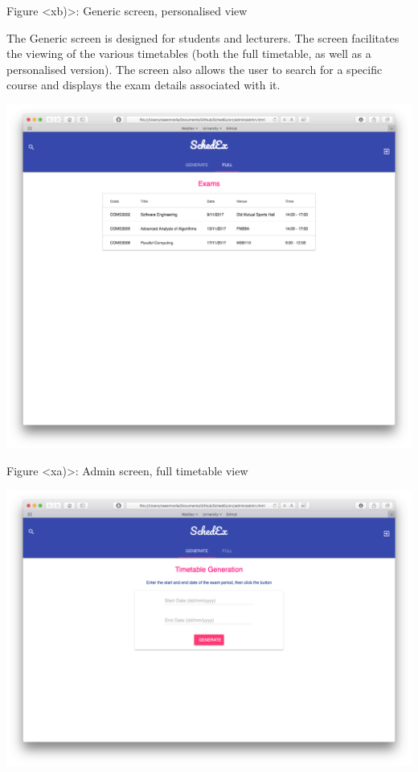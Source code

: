 \documentclass{article}
\begin{document}
Figure <xb)>: Generic screen, personalised view

The Generic screen is designed for students and lecturers. The screen facilitates the viewing of the various timetables (both the full timetable, as well as a personalised version). The screen also allows the user to search for a specific course and displays the exam details associated with it.

\centerline{\includegraphics[scale=0.4]{admin_full}}

Figure <xa)>: Admin screen, full timetable view

\centerline{\includegraphics[scale=0.4]{admin_generate}}
\end{document}
